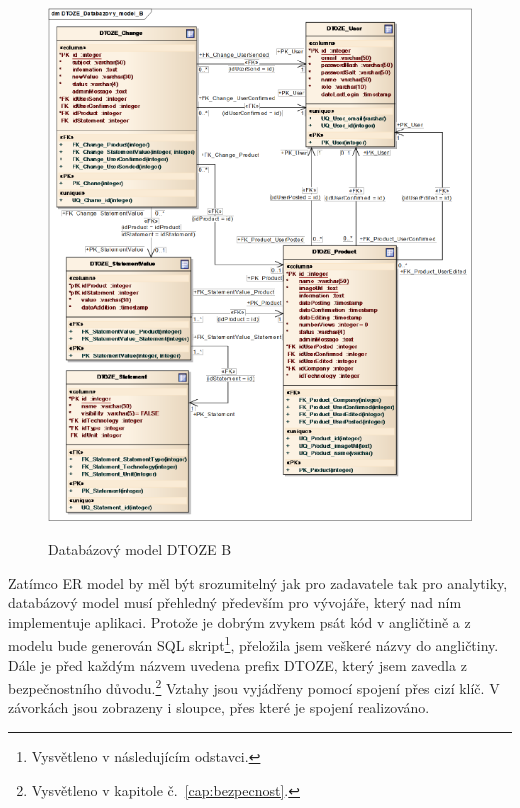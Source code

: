 \documentclass[11pt,a4paper]{article}
\begin{document}
\begin{figure}[H] 
\centering 
\caption{Databázový model DTOZE B} 
\vspace{0.1cm}
\includegraphics[scale=0.75]{DTOZE_fyzB_n} 
\label{fig:DTOZE_fyz_B}
\end{figure} 

Zatímco ER model by měl být srozumitelný jak pro zadavatele tak pro analytiky, databázový model musí přehledný především pro vývojáře, který nad ním implementuje aplikaci. Protože je dobrým zvykem psát kód v angličtině a z modelu bude generován SQL skript\footnote{Vysvětleno v následujícím odstavci.}, přeložila jsem veškeré názvy do angličtiny. Dále je před každým názvem uvedena prefix DTOZE, který jsem zavedla z bezpečnostního důvodu.\footnote{Vysvětleno v kapitole č.~\ref{cap:bezpecnost}.} Vztahy jsou vyjádřeny pomocí spojení přes cizí klíč. V závorkách jsou zobrazeny i sloupce, přes které je spojení realizováno. 
\end{document}
